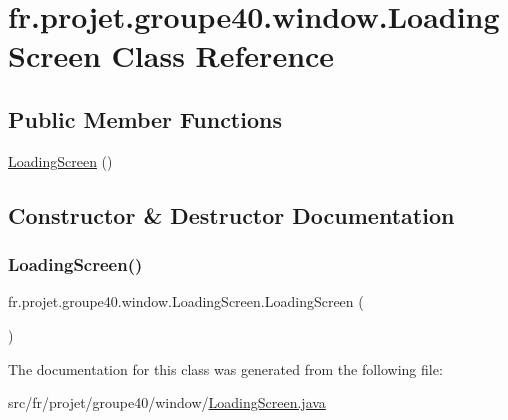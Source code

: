 \hypertarget{classfr_1_1projet_1_1groupe40_1_1window_1_1_loading_screen}{}\section{fr.\+projet.\+groupe40.\+window.\+Loading\+Screen Class Reference}
\label{classfr_1_1projet_1_1groupe40_1_1window_1_1_loading_screen}
\subsection*{Public Member Functions}
\begin{DoxyCompactItemize}
\item 
\hyperlink{classfr_1_1projet_1_1groupe40_1_1window_1_1_loading_screen_a9cdc0dc8e1f08399b011800bfdb7d0cd}{Loading\+Screen} ()
\end{DoxyCompactItemize}


\subsection{Constructor \& Destructor Documentation}
\mbox{\label{classfr_1_1projet_1_1groupe40_1_1window_1_1_loading_screen_a9cdc0dc8e1f08399b011800bfdb7d0cd}} 
\subsubsection{\texorpdfstring{Loading\+Screen()}{LoadingScreen()}}
{\footnotesize\ttfamily fr.\+projet.\+groupe40.\+window.\+Loading\+Screen.\+Loading\+Screen (\begin{DoxyParamCaption}{ }\end{DoxyParamCaption})}



The documentation for this class was generated from the following file\+:\begin{DoxyCompactItemize}
\item 
src/fr/projet/groupe40/window/\hyperlink{_loading_screen_8java}{Loading\+Screen.\+java}\end{DoxyCompactItemize}
